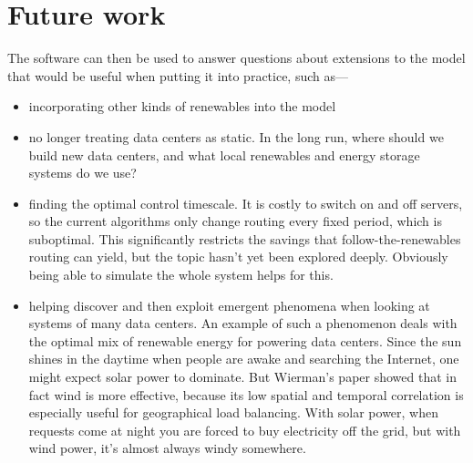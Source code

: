 \documentclass{acm_proc_article-sp}
\begin{document}
\section{Future work}
The software can then be used to answer questions about extensions to the model that would be useful when putting it into practice, such as—
\begin{itemize}
\item incorporating other kinds of renewables into the model
\item no longer treating data centers as static. In the long run, where should we build new data centers, and what local renewables and energy storage systems do we use?
\item finding the optimal control timescale. It is costly to switch on and off servers, so the current algorithms only change routing every fixed period, which is suboptimal. This significantly restricts the savings that follow-the-renewables routing can yield, but the topic hasn’t yet been explored deeply. Obviously being able to simulate the whole system helps for this.
\item helping discover and then exploit emergent phenomena when looking at systems of many data centers. An example of such a phenomenon deals with the optimal mix of renewable energy for powering data centers. Since the sun shines in the daytime when people are awake and searching the Internet, one might expect solar power to dominate. But Wierman’s paper showed that in fact wind is more effective, because its low spatial and temporal correlation is especially useful for geographical load balancing. With solar power, when requests come at night you are forced to buy electricity off the grid, but with wind power, it’s almost always windy somewhere.
\end{itemize}



\end{document}
